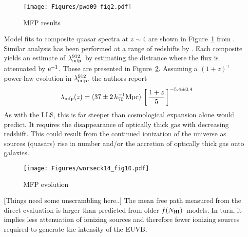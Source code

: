 \documentclass[graybox]{svmult}
\def\ltk{\left [ \,}
\def\rtk{\, \right  ] }
\newcommand{\mnhi}{N_{\rm HI}}
\def\mfnhi{f(\mnhi)}
\def\fnhi{$\mfnhi$}
\def\mlmfp{\lambda_{\rm mfp}^{912}}
\def\lmfp{$\mlmfp$}
\begin{document}
%
\begin{figure}[b]
\sidecaption
\texttt{[image: Figures/pwo09\_fig2.pdf]}
%
%
\caption{MFP results
}
\label{fig:pwo_fig2}       %
\end{figure}

Model fits to composite quasar spectra at $z \sim 4$ are 
shown in Figure~\ref{fig:pwo_fig2} from \cite{pwo09}.
Similar analysis has been performed at a range of redshifts
by \cite{omeara13,fop+13,worseck+14}.
Each composite yields an estimate of \lmfp\ by estimating the
distrance where the flux is attenuated by $\rm e^{-1}$.
These are presented in Figure~\ref{fig:w14_fig10}.
Assuming a $(1+z)^\gamma$ power-law evolution in \lmfp,
the authors report 
\begin{equation}
\lambda_{\rm mfp}(z) = (37 \pm 2 \, h_{70}^{-1} {\rm Mpc})
\, \ltk \frac{1+z}{5} \rtk^{-5.4 \pm 0.4}
\end{equation}
As with the LLS, this is far steeper than cosmological
expansion alone would predict.  It requires the disappearance
of optically thick gas with decreasing redshift.  This
could result from the
continued ionization of the universe as sources (quasars)
rise in number and/or
the accretion of optically thick gas onto galaxies.

%
\begin{figure}[b]
\sidecaption
\texttt{[image: Figures/worseck14\_fig10.pdf]}
%
%
\caption{MFP evolution
}
\label{fig:w14_fig10}       %
\end{figure}


[Things need some unscrambling here..]
The mean free path measured from the direct evaluation
is larger than predicted from older \fnhi\ models.
In turn, it implies
less attenuation of ionizing sources
and therefore fewer ionizing sources required to generate the 
intensity of the EUVB.
\end{document}
